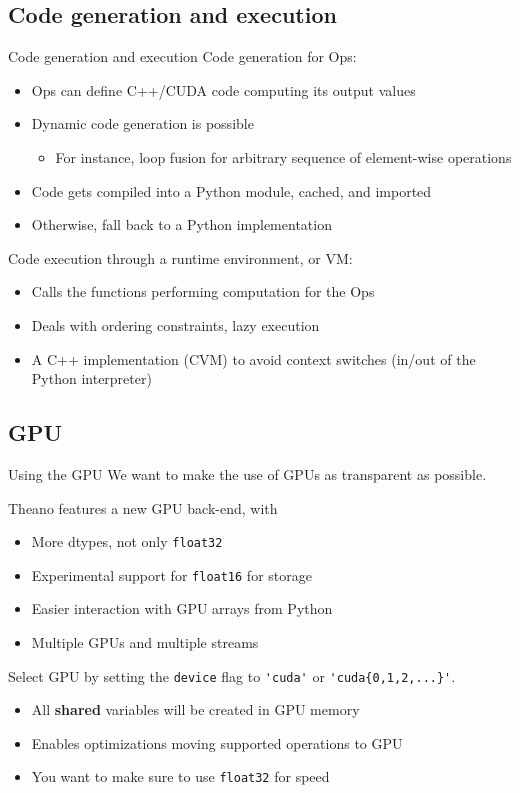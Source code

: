 \documentclass[a4paper,9pt]{beamer}
\begin{document}
\subsection{Code generation and execution}
\begin{frame}[fragile]{Code generation and execution}
  Code generation for Ops:
  \begin{itemize}
    \item Ops can define C++/CUDA code computing its output values
    \item Dynamic code generation is possible
      \begin{itemize}
        \item For instance, loop fusion for arbitrary sequence of element-wise operations
      \end{itemize}
    \item Code gets compiled into a Python module, cached, and imported
    \item Otherwise, fall back to a Python implementation
  \end{itemize}

  Code execution through a runtime environment, or VM:
  \begin{itemize}
    \item Calls the functions performing computation for the Ops
    \item Deals with ordering constraints, lazy execution
    \item A C++ implementation (CVM) to avoid context switches
      (in/out of the Python interpreter)
  \end{itemize}
\end{frame}

\subsection{GPU}
\begin{frame}[fragile]{Using the GPU}
  We want to make the use of GPUs as transparent as possible.

  Theano features a new GPU back-end, with
  \begin{itemize}
    \item More dtypes, not only \verb|float32|
    \item Experimental support for \verb|float16| for storage
    \item Easier interaction with GPU arrays from Python
    \item Multiple GPUs and multiple streams
  \end{itemize}

  Select GPU by setting the \verb|device| flag to \verb|'cuda'| or \verb|'cuda{0,1,2,...}'|.
  \begin{itemize}
    \item All {\bf shared} variables will be created in GPU memory
    \item Enables optimizations moving supported operations to GPU
    \item You want to make sure to use \verb|float32| for speed
  \end{itemize}
\end{frame}
\end{document}
